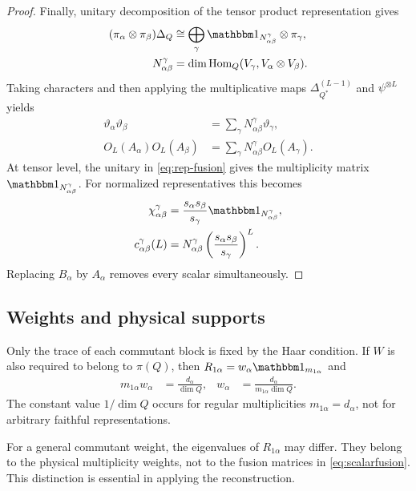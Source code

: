 \documentclass[aps,pra,reprint,nofootinbib,onecolumn]{revtex4-2}
\begin{document}
\begin{proof}
	Finally, unitary decomposition of the tensor product representation
	gives
	\begin{align}
		(\pi_\alpha\otimes\pi_\beta)\Delta_Q
		 & \cong\bigoplus_\gamma
		\Id_{N_{\alpha\beta}^{\gamma}}\otimes\pi_\gamma,
		\label{eq:rep-fusion}                                           \\
		N_{\alpha\beta}^{\gamma}
		 & =\dim\operatorname{Hom}_Q(V_\gamma,V_\alpha\otimes V_\beta).
	\end{align}
	Taking characters and then applying the multiplicative maps
	$\Delta_{Q^*}^{(L-1)}$ and $\psi^{\otimes L}$ yields
	\begin{align}
		\vartheta_\alpha\vartheta_\beta
		 & =\sum_\gamma N_{\alpha\beta}^{\gamma}\vartheta_\gamma,
		\\
		O_L(A_\alpha)O_L(A_\beta)
		 & =\sum_\gamma N_{\alpha\beta}^{\gamma}O_L(A_\gamma).
	\end{align}
	At tensor level, the unitary in \cref{eq:rep-fusion} gives the
	multiplicity matrix $\Id_{N_{\alpha\beta}^{\gamma}}$.
	For normalized representatives this becomes
	\begin{align}
		\chi_{\alpha\beta}^{\gamma}
		 & =\frac{s_\alpha s_\beta}{s_\gamma}
		\Id_{N_{\alpha\beta}^{\gamma}},
		\\
		c_{\alpha\beta}^{\gamma}(L)
		 & =N_{\alpha\beta}^{\gamma}
		\left(\frac{s_\alpha s_\beta}{s_\gamma}\right)^L.
		\label{eq:scalarfusion}
	\end{align}
	Replacing $B_\alpha$ by $A_\alpha$ removes every scalar
	simultaneously.
\end{proof}

\subsection{Weights and physical supports}

Only the trace of each commutant block is fixed by the Haar condition.
If $W$ is also required to belong to $\pi(Q)$, then
$R_{1\alpha}=w_\alpha\Id_{m_{1\alpha}}$ and
\begin{align}
	m_{1\alpha}w_\alpha & =\frac{d_\alpha}{\dim Q},
	                    &
	w_\alpha            & =\frac{d_\alpha}{m_{1\alpha}\dim Q}.
	\label{eq:centralweight}
\end{align}
The constant value $1/\dim Q$ occurs for regular multiplicities
$m_{1\alpha}=d_\alpha$, not for arbitrary faithful representations.

For a general commutant weight, the eigenvalues of $R_{1\alpha}$
may differ. They belong to the physical multiplicity weights, not
to the fusion matrices in \cref{eq:scalarfusion}. This distinction
is essential in applying the reconstruction.
\end{document}
